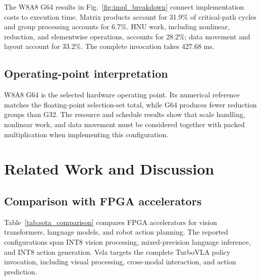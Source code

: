 \documentclass[journal,10pt]{IEEEtran}
\begin{document}
The W8A8 G64 results in Fig.~\ref{fig:impl_breakdown} connect implementation costs to execution time. Matrix products account for 31.9\% of critical-path cycles and group processing accounts for 6.7\%. HNU work, including nonlinear, reduction, and elementwise operations, accounts for 28.2\%; data movement and layout account for 33.2\%. The complete invocation takes 427.68 ms.

\subsection{Operating-point interpretation}
W8A8 G64 is the selected hardware operating point. Its numerical reference matches the floating-point selection-set total, while G64 produces fewer reduction groups than G32. The resource and schedule results show that scale handling, nonlinear work, and data movement must be considered together with packed multiplication when implementing this configuration.

\section{Related Work and Discussion}\label{sec:related}
\subsection{Comparison with FPGA accelerators}
Table~\ref{tab:sota_comparison} compares FPGA accelerators for vision transformers, language models, and robot action planning. The reported configurations span INT8 vision processing, mixed-precision language inference, and INT8 action generation. Vela targets the complete TurboVLA policy invocation, including visual processing, cross-modal interaction, and action prediction.
\end{document}
